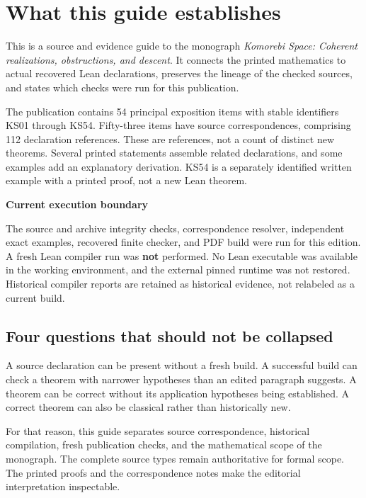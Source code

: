 \documentclass[11pt]{article}
\begin{document}
\KomorebiCover
\section*{What this guide establishes}
This is a source and evidence guide to the monograph \emph{Komorebi Space: Coherent realizations, obstructions, and descent}. It connects the printed mathematics to actual recovered Lean declarations, preserves the lineage of the checked sources, and states which checks were run for this publication.

The publication contains 54 principal exposition items with stable identifiers KS01 through KS54. Fifty-three items have source correspondences, comprising 112 declaration references. These are references, not a count of distinct new theorems. Several printed statements assemble related declarations, and some examples add an explanatory derivation. KS54 is a separately identified written example with a printed proof, not a new Lean theorem.

\begin{scopebox}
\textbf{Current execution boundary}\par
The source and archive integrity checks, correspondence resolver, independent exact examples, recovered finite checker, and PDF build were run for this edition. A fresh Lean compiler run was \textbf{not} performed. No Lean executable was available in the working environment, and the external pinned runtime was not restored. Historical compiler reports are retained as historical evidence, not relabeled as a current build.
\end{scopebox}

\subsection*{Four questions that should not be collapsed}
A source declaration can be present without a fresh build. A successful build can check a theorem with narrower hypotheses than an edited paragraph suggests. A theorem can be correct without its application hypotheses being established. A correct theorem can also be classical rather than historically new.

For that reason, this guide separates source correspondence, historical compilation, fresh publication checks, and the mathematical scope of the monograph. The complete source types remain authoritative for formal scope. The printed proofs and the correspondence notes make the editorial interpretation inspectable.
\end{document}
